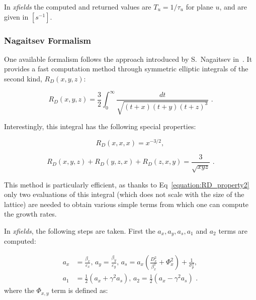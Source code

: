 In \textit{xfields} the computed and returned values are \(T_u = 1 / \tau_u\) for plane \(u\), and are given in \(\left[s^{-1}\right]\). 

\subsubsection{Nagaitsev Formalism}  

One available formalism follows the approach introduced by S.~Nagaitsev in~\cite{PRAB:Nagaitsev:IBS_formulas_fast_numerical_evaluation}.
It provides a fast computation method through symmetric elliptic integrals of the second kind, \(R_D(x,y,z)\):

\begin{equation}
    R_D(x, y, z) = \frac{3}{2} \int_{0}^{\infty} \frac{dt}{\sqrt{(t + x)(t + y)(t + z)^3}} \text{ .}
    \label{equation:elliptic_integrals}
\end{equation}

Interestingly, this integral has the following special properties:

\begin{equation}
    R_D(x, x, x) = x^{-3/2} \text{,  }
    \label{equation:RD_property1}
\end{equation}

\begin{equation}
    R_D(x, y, z) + R_D(y, z, x) + R_D(z, x, y) = \frac{3}{\sqrt{xyz}} \text{ .}
    \label{equation:RD_property2}
\end{equation}

This method is particularly efficient, as thanks to Eq~\eqref{equation:RD_property2} only two evaluations of this integral (which does not scale with the size of the lattice) are needed to obtain various simple terms from which one can compute the growth rates.
\newline

In \textit{xfields}, the following steps are taken.
First the \(a_x, a_y, a_s, a_1\) and \(a_2\) terms are computed:

\begin{equation}
    \begin{aligned}
        a_x &= \frac{\beta_x}{\varepsilon_x} \text{,  }
        a_y = \frac{\beta_y}{\varepsilon_y} \text{,  }
        a_s = a_x \left( \frac{D_x^{2}}{\beta_x^{2}} + \Phi_x^2 \right) + \frac{1}{\sigma_p^{2}} \text{,  } \\
        a_1 &= \frac{1}{2} (a_x + \gamma^2 a_s) \text{,  }
        a_2 = \frac{1}{2} (a_x - \gamma^2 a_s) \text{ .}
    \end{aligned}
    \label{equation:nagaitsev_step1}
\end{equation}
where the \(\Phi_{x,y}\) term is defined as:

